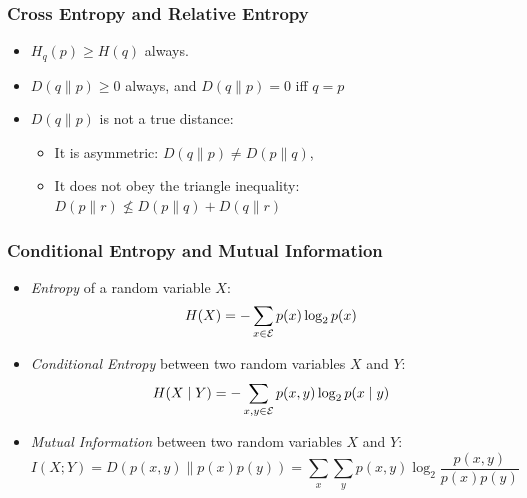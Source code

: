 \documentclass[handout]{beamer}
\begin{document}
\begin{frame}
\frametitle{Cross Entropy and Relative Entropy}
\begin{itemize}[<+->]
\item $H_{q}(p) \geq H(q)$ always.
\item $D(q \| p) \geq 0$ always, and $D(q \| p) = 0$ iff $q = p$
\item $D(q \| p)$ is not a true distance: 
  \begin{itemize}
  \item It is asymmetric: $D(q \| p) \neq D(p \| q)$, 
  \item It does not obey the triangle inequality: $D(p \| r) \nleq D(p \| q) + D(q \| r)$
  \end{itemize}
\end{itemize}

\end{frame}

\begin{frame}
\frametitle{Conditional Entropy and Mutual Information}
\begin{itemize}[<+->]
\item {\it Entropy} of a random variable $X$:
\[ H(X) = - \sum_{x \in {\cal E}} p(x) \log_2 p(x) \]
\item {\it Conditional Entropy} between two random variables $X$ and $Y$:
\[ H(X \mid Y) = - \sum_{x,y \in {\cal E}} p(x,y) \log_2 p(x
\mid y) \]
\item {\it Mutual Information} between two random variables $X$ and $Y$:
\[ I(X;Y) = D(p(x,y) \| p(x)p(y)) = \sum_x \sum_y p(x,y) \log_2
\frac{p(x,y)}{p(x)p(y)} \]
\end{itemize}

\end{frame}
\end{document}
